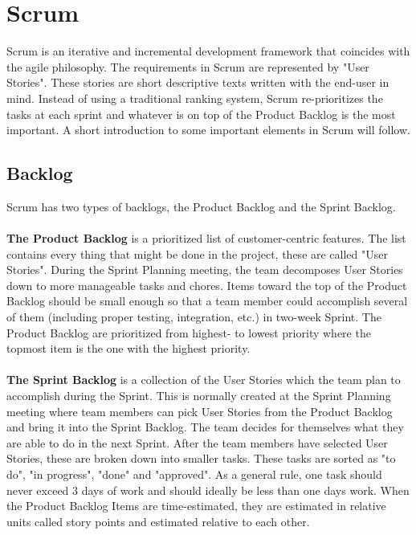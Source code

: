 \section{Scrum}
Scrum is an iterative and incremental development framework that coincides with the agile philosophy. The requirements in Scrum are represented by "User Stories". These stories are short descriptive texts written with the end-user in mind. Instead of using a traditional ranking system, Scrum re-prioritizes the tasks at each sprint and whatever is on top of the Product Backlog is the most important. A short introduction to some important elements in Scrum will follow. 

\subsection{Backlog}
Scrum has two types of backlogs, the Product Backlog and the Sprint Backlog.
\\ \\ 
\textbf{The Product Backlog} is a prioritized list of customer-centric features. The list contains every thing that might be done in the project, these are called "User Stories". During the Sprint Planning meeting, the team decomposes User Stories down to more manageable tasks and chores. Items toward the top of the Product Backlog should be small enough so that a team member could accomplish several of them (including proper testing, integration, etc.) in two-week Sprint. The Product Backlog are prioritized from highest- to lowest priority where the topmost item is the one with the highest priority.   
\\ \\ 
\textbf{The Sprint Backlog} is a collection of the User Stories which the team plan to accomplish during the Sprint. This is normally created at the Sprint Planning meeting where team members can pick User Stories from the Product Backlog and bring it into the Sprint Backlog. The team decides for themselves what they are able to do in the next Sprint. After the team members have selected User Stories, these are broken down into smaller tasks. These tasks are sorted as "to do", "in progress", "done" and "approved". As a general rule, one task should never exceed 3 days of work and should ideally be less than one days work.
When the Product Backlog Items are time-estimated, they are estimated in relative units called story points and estimated relative to each other.\\
\\

